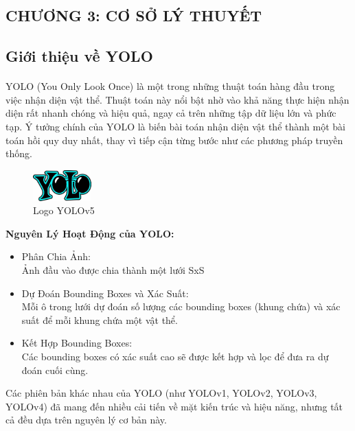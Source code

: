 \begin{flushleft}
    \fontsize{16}{20}\selectfont
    \section*{CHƯƠNG 3: CƠ SỞ LÝ THUYẾT}
    \fontsize{13}{20}\selectfont
    \setcounter{section}{3}
    \setcounter{subsection}{0}
    \subsection{Giới thiệu về YOLO}
    \fontsize{13}{20}\selectfont\paragraph{}
    YOLO (You Only Look Once) là một trong những thuật toán hàng đầu trong việc nhận diện vật thể. Thuật toán này nổi bật nhờ vào khả năng thực hiện nhận diện rất nhanh chóng và hiệu quả, ngay cả trên những tập dữ liệu lớn và phức tạp. Ý tưởng chính của YOLO là biến bài toán nhận diện vật thể thành một bài toán hồi quy duy nhất, thay vì tiếp cận từng bước như các phương pháp truyền thống.\\
    \begin{figure}[h]
        \centering
        \includegraphics[width=0.2\textwidth]{images/YOLO.jpg}
        \caption{Logo YOLOv5}\label{fig:logo_YOLO}
    \end{figure}
    \textbf{Nguyên Lý Hoạt Động của YOLO:}\\
    \begin{itemize}
            \item Phân Chia Ảnh: \\Ảnh đầu vào được chia thành một lưới SxS
            \item Dự Đoán Bounding Boxes và Xác Suất:\\Mỗi ô trong lưới dự đoán số lượng các bounding boxes (khung chứa) và xác suất để mỗi khung chứa một vật thể.
            \item Kết Hợp Bounding Boxes: \\Các bounding boxes có xác suất cao sẽ được kết hợp và lọc để đưa ra dự đoán cuối cùng.
    \end{itemize}
    Các phiên bản khác nhau của YOLO (như YOLOv1, YOLOv2, YOLOv3, YOLOv4) đã mang đến nhiều cải tiến về mặt kiến trúc và hiệu năng, nhưng tất cả đều dựa trên nguyên lý cơ bản này.\\

\end{flushleft}
